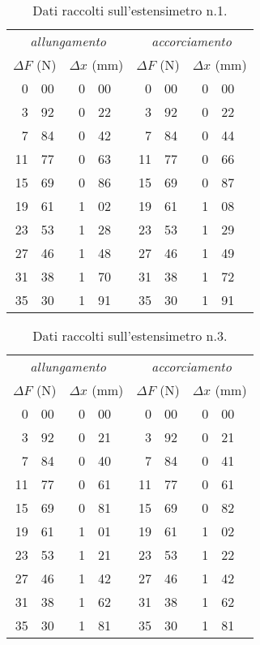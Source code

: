 \begin{table}[hp]\caption{Dati raccolti sull'estensimetro n.1.}\label{tab1}
\centering \small
\begin{tabular}{*4{r@{.}l}}
\multicolumn{4}{c}{\emph{allungamento}} & \multicolumn{4}{c}{\emph{accorciamento}}\\
\multicolumn{2}{c}{$\Delta F$ (\unit{N})}
&\multicolumn{2}{c}{$\Delta x$ (\unit{mm})}
&\multicolumn{2}{c}{$\Delta F$ (\unit{N})}
&\multicolumn{2}{c}{$\Delta x$ (\unit{mm})}\\\hline
0&00 &0&00 &0&00 &0&00\\
3&92 &0&22 &3&92 &0&22\\
7&84 &0&42 &7&84 &0&44\\
11&77 &0&63 &11&77 &0&66\\
15&69 &0&86 &15&69 &0&87\\
19&61 &1&02 &19&61 &1&08\\
23&53 &1&28 &23&53 &1&29\\
27&46 &1&48 &27&46 &1&49\\
31&38 &1&70 &31&38 &1&72\\
35&30 &1&91 &35&30 &1&91\\
\end{tabular}
\end{table}
\begin{table}[hp]\caption{Dati raccolti sull'estensimetro n.3.}\label{tab3}
\centering \small
\begin{tabular}{*4{r@{.}l}}
\multicolumn{4}{c}{\emph{allungamento}} & \multicolumn{4}{c}{\emph{accorciamento}}\\
\multicolumn{2}{c}{$\Delta F$ (\unit{N})}
&\multicolumn{2}{c}{$\Delta x$ (\unit{mm})}
&\multicolumn{2}{c}{$\Delta F$ (\unit{N})}
&\multicolumn{2}{c}{$\Delta x$ (\unit{mm})}\\\hline
0&00 &0&00 &0&00 &0&00\\
3&92 &0&21 &3&92 &0&21\\
7&84 &0&40 &7&84 &0&41\\
11&77 &0&61 &11&77 &0&61\\
15&69 &0&81 &15&69 &0&82\\
19&61 &1&01 &19&61 &1&02\\
23&53 &1&21 &23&53 &1&22\\
27&46 &1&42 &27&46 &1&42\\
31&38 &1&62 &31&38 &1&62\\
35&30 &1&81 &35&30 &1&81
\end{tabular}
\end{table}